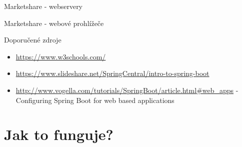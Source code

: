 \documentclass{beamer}
\begin{document}
\begin{frame}{Marketshare - webservery}
\end{frame}


\begin{frame}{Marketshare - webové prohlížeče}
\end{frame}

\begin{frame}{Doporučené zdroje}
	\begin{itemize}
		\item \url{https://www.w3schools.com/}
		\item \url{https://www.slideshare.net/SpringCentral/intro-to-spring-boot}
		\item \url{http://www.vogella.com/tutorials/SpringBoot/article.html#web_apps}
		- Configuring Spring Boot for web based applications
	\end{itemize}
\end{frame}

\section{Jak to funguje?}
\end{document}
